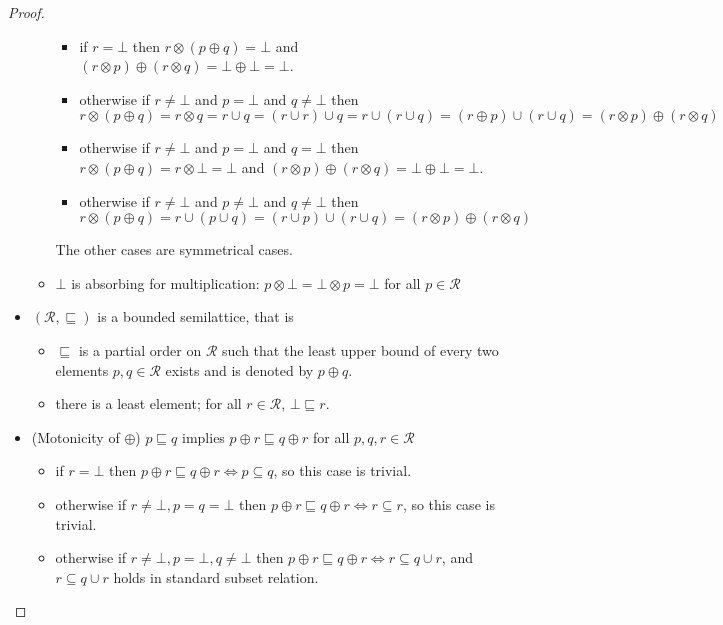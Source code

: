 \begin{proof}
\begin{itemize}
\begin{itemize}
        \begin{itemize}
            \item if $r = \bot$ then $r\otimes(p\oplus q) = \bot$ and $(r\otimes p) \oplus (r \otimes q) = \bot \oplus \bot = \bot$.
            \item otherwise if $r\neq \bot$ and $p = \bot$ and $q \neq \bot$ then $r\otimes(p\oplus q) = r\otimes q = r\cup q = (r\cup r) \cup q = r\cup (r \cup q) = (r \oplus p) \cup (r \cup q) = (r\otimes p) \oplus (r \otimes q)$
            \item otherwise if $r\neq \bot$ and $p = \bot$ and $q = \bot$ then $r\otimes(p\oplus q) = r\otimes \bot = \bot$ and $(r\otimes p) \oplus (r \otimes q) = \bot \oplus \bot = \bot$.
            \item otherwise if $r\neq \bot$ and $p \neq \bot$ and $q \neq \bot$ then $r\otimes(p\oplus q) = r\cup(p\cup q) = (r\cup p)\cup (r\cup q) = (r\otimes p) \oplus (r \otimes q)$
        \end{itemize}
        The other cases are symmetrical cases.
        \item $\bot$ is absorbing for multiplication: $p\otimes \bot= \bot \otimes p = \bot$ for all $p\in\mathcal{R}$
    \end{itemize}
\item $(\mathcal{R},\sqsubseteq)$ is a bounded semilattice, that is
    \begin{itemize}
        \item $\sqsubseteq$ is a partial order on $\mathcal{R}$ such that the least upper bound of every two elements $p,q \in \mathcal{R}$ exists and is denoted by $p\oplus q$.
        \item there is a least element; for all $r\in\mathcal{R}$, $\bot \sqsubseteq r$.
    \end{itemize}
\item (Motonicity of $\oplus$) $p\sqsubseteq q$ implies $p\oplus r\sqsubseteq q\oplus r$ for all $p, q, r \in \mathcal{R}$
   \begin{itemize}
        \item if $r = \bot$ then $p\oplus r \sqsubseteq q\oplus r \Leftrightarrow p\subseteq q$, so this case is trivial.
        \item otherwise if $r \neq \bot, p = q = \bot$ then $p\oplus r \sqsubseteq q \oplus r \Leftrightarrow r\subseteq r$, so this case is trivial.
        \item otherwise if $r \neq \bot, p = \bot, q\neq \bot$ then $p\oplus r \sqsubseteq q \oplus r \Leftrightarrow r\subseteq q\cup r$, and $r\subseteq q\cup r$ holds in standard subset relation.

\end{itemize}
\end{itemize}
\end{proof}
